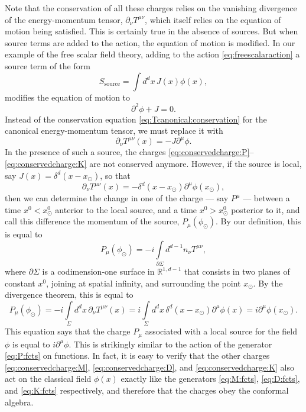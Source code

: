 \documentclass[a4paper,12pt]{article}
\numberwithin{equation}{section}
\begin{document}
Note that the conservation of all these charges relies on the vanishing divergence of the energy-momentum tensor, $\partial_\nu T^{\mu\nu}$, which itself relies on the equation of motion being satisfied.
This is certainly true in the absence of sources. But when source terms are added to the action, the equation of motion is modified.
In our example of the free scalar field theory, adding to the action \eqref{eq:freescalaraction} a source term of the form
\begin{equation}
	S_\text{source} = \int d^dx \, J(x) \phi(x),
\end{equation}
modifies the equation of motion to
\begin{equation}
	\partial^2 \phi + J = 0.
\end{equation}
Instead of the conservation equation \eqref{eq:Tcanonical:conservation} for the canonical energy-momentum tensor, we must replace it with
\begin{equation}
	\partial_\nu T^{\mu\nu}(x) = - J \partial^\mu \phi.
\end{equation}
In the presence of such a source, the charges \eqref{eq:conservedcharge:P}--\eqref{eq:conservedcharge:K} are not conserved anymore.
However, if the source is local, say $J(x) = \delta^d(x - x_\odot)$, so that
\begin{equation}
	\partial_\nu T^{\mu\nu}(x) = -\delta^d(x - x_\odot)
	\partial^\mu \phi(x_\odot),
\end{equation}
then we can determine the change in one of the charge --- say $P^\mu$ ---
between a time $x^0 < x_\odot^0$ anterior to the local source, and a time $x^0 > x_\odot^0$ posterior to it, and call this difference the momentum of the source, $P_\mu(\phi_\odot)$. 
By our definition, this is equal to
\begin{equation}
	P_\mu(\phi_\odot) = -i \int\limits_{\partial\Sigma} d^{d-1} n_\nu
	T^{\mu\nu},
\end{equation}
where $\partial\Sigma$ is a codimension-one surface in $\mathbb{R}^{1,d-1}$ that consists in two planes of constant $x^0$, joining at spatial infinity, and surrounding the point $x_\odot$.
By the divergence theorem, this is equal to 
\begin{equation}
	P_\mu(\phi_\odot) = -i \int\limits_{\Sigma} d^dx \, \partial_\nu
	T^{\mu\nu}(x)
	= i \int\limits_{\Sigma} d^dx \, \delta^d(x - x_\odot)
	\partial^\mu \phi(x)
	= i \partial^\mu \phi(x_\odot).
	\label{eq:P:localsource}
\end{equation}
This equation says that the charge $P_\mu$ associated with a local source for the field $\phi$ is equal to $i \partial^\mu \phi$. This is strikingly similar to the action of the generator \eqref{eq:P:fcts} on functions. In fact, it is easy to verify that the other charges \eqref{eq:conservedcharge:M}, \eqref{eq:conservedcharge:D}, and \eqref{eq:conservedcharge:K} also act on the classical field $\phi(x)$ exactly like the generators \eqref{eq:M:fcts}, \eqref{eq:D:fcts}, and \eqref{eq:K:fcts} respectively, and therefore that the charges obey the conformal algebra.
\end{document}
